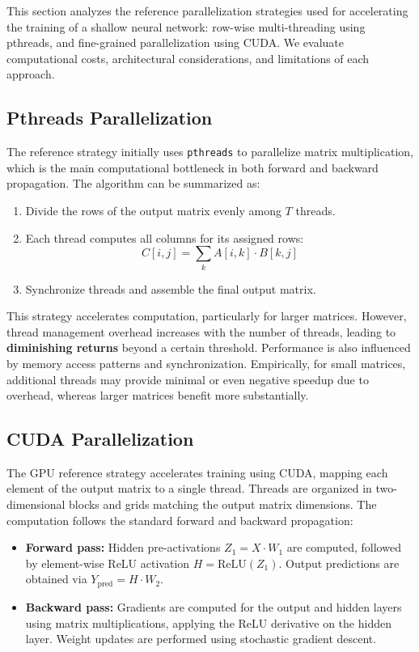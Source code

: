 \documentclass[conference, 12pt]{IEEEtran}
\begin{document}
This section analyzes the reference parallelization strategies used for accelerating the training of a shallow neural network: row-wise multi-threading using pthreads, and fine-grained parallelization using CUDA. We evaluate computational costs, architectural considerations, and limitations of each approach.

\subsection{Pthreads Parallelization}
The reference strategy initially uses \texttt{pthreads} to parallelize matrix multiplication, which is the main computational bottleneck in both forward and backward propagation. The algorithm can be summarized as:

\begin{enumerate}
    \item Divide the rows of the output matrix evenly among $T$ threads.
    \item Each thread computes all columns for its assigned rows:
    \[
    C[i,j] = \sum_{k} A[i,k] \cdot B[k,j]
    \]
    \item Synchronize threads and assemble the final output matrix.
\end{enumerate}

This strategy accelerates computation, particularly for larger matrices. However, thread management overhead increases with the number of threads, leading to \textbf{diminishing returns} beyond a certain threshold. Performance is also influenced by memory access patterns and synchronization. Empirically, for small matrices, additional threads may provide minimal or even negative speedup due to overhead, whereas larger matrices benefit more substantially.

\subsection{CUDA Parallelization}
The GPU reference strategy accelerates training using CUDA, mapping each element of the output matrix to a single thread. Threads are organized in two-dimensional blocks and grids matching the output matrix dimensions. The computation follows the standard forward and backward propagation:

\begin{itemize}
    \item \textbf{Forward pass:} Hidden pre-activations $Z_1 = X \cdot W_1$ are computed, followed by element-wise ReLU activation $H = \text{ReLU}(Z_1)$. Output predictions are obtained via $Y_{\text{pred}} = H \cdot W_2$.
    \item \textbf{Backward pass:} Gradients are computed for the output and hidden layers using matrix multiplications, applying the ReLU derivative on the hidden layer. Weight updates are performed using stochastic gradient descent.
\end{itemize}
\end{document}
